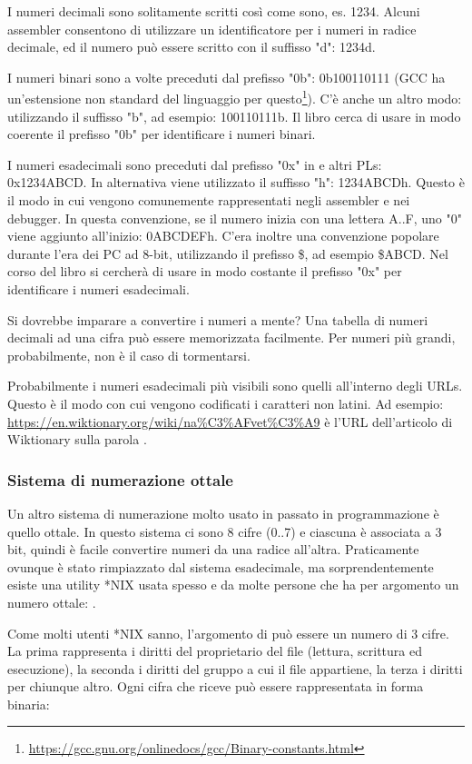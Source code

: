 I numeri decimali sono solitamente scritti così come sono, es. 1234. Alcuni assembler consentono di utilizzare un identificatore per i numeri in radice decimale, ed il numero può essere scritto con il suffisso "d": 1234d.

I numeri binari sono a volte preceduti dal prefisso "0b": 0b100110111 (\ac{GCC} ha un'estensione non standard del linguaggio per questo\footnote{\url{https://gcc.gnu.org/onlinedocs/gcc/Binary-constants.html}}).
C'è anche un altro modo: utilizzando il suffisso "b", ad esempio: 100110111b.
Il libro cerca di usare in modo coerente il prefisso "0b" per identificare i numeri binari.

I numeri esadecimali sono preceduti dal prefisso "0x" in \CCpp e altri \ac{PL}s: 0x1234ABCD.
In alternativa viene utilizzato il suffisso "h": 1234ABCDh. Questo è il modo in cui vengono comunemente rappresentati negli assembler e nei debugger.
In questa convenzione, se il numero inizia con una lettera A..F, uno "0" viene aggiunto all'inizio: 0ABCDEFh.
C'era inoltre una convenzione popolare durante l'era dei PC ad 8-bit, utilizzando il prefisso \$, ad esempio \$ABCD.
Nel corso del libro si cercherà di usare in modo costante il prefisso "0x" per identificare i numeri esadecimali.

Si dovrebbe imparare a convertire i numeri a mente? Una tabella di numeri decimali ad una cifra può essere memorizzata facilmente.
Per numeri più grandi, probabilmente, non è il caso di tormentarsi.

Probabilmente i numeri esadecimali più visibili sono quelli all'interno degli \ac{URL}s.
Questo è il modo con cui vengono codificati i caratteri non latini.
Ad esempio:
\url{https://en.wiktionary.org/wiki/na\%C3\%AFvet\%C3\%A9} è l'\ac{URL} dell'articolo di Wiktionary sulla parola .

\subsubsection{Sistema di numerazione ottale}

Un altro sistema di numerazione molto usato in passato in programmazione è quello ottale.
In questo sistema ci sono 8 cifre (0..7) e ciascuna è associata a 3 bit, quindi è facile convertire numeri da una radice all'altra.
Praticamente ovunque è stato rimpiazzato dal sistema esadecimale, ma sorprendentemente esiste una utility *NIX usata spesso e da molte persone che ha per argomento un numero ottale: .

Come molti utenti *NIX sanno, l'argomento di  può essere un numero di 3 cifre. La prima rappresenta i diritti del proprietario del file (lettura, scrittura ed esecuzione), la seconda i diritti del gruppo a cui il file appartiene, la terza i diritti per chiunque altro.
Ogni cifra che  riceve può essere rappresentata in forma binaria:

